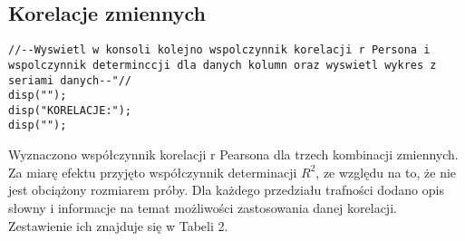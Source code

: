 \documentclass[a4paper, 11pt]{article}
\begin{document}
\subsection{Korelacje zmiennych}
\begin{lstlisting}
//--Wyswietl w konsoli kolejno wspolczynnik korelacji r Persona i wspolczynnik determinccji dla danych kolumn oraz wyswietl wykres z seriami danych--"//
disp("");
disp("KORELACJE:");
disp("");
\end{lstlisting}
\-\hspace{8mm}Wyznaczono współczynnik korelacji r Pearsona dla trzech kombinacji zmiennych. Za miarę efektu przyjęto współczynnik determinacji $R^{2}$, ze względu na to, że nie jest obciążony rozmiarem próby. Dla każdego przedziału trafności dodano opis słowny i informacje na temat możliwości zastosowania danej korelacji. Zestawienie ich znajduje się w Tabeli 2.
\end{document}
